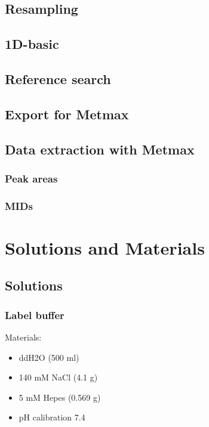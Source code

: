 \documentclass[]{book}
\providecommand{\tightlist}{%
  \setlength{\itemsep}{0pt}\setlength{\parskip}{0pt}}
\theoremstyle{definition}
\theoremstyle{definition}
\theoremstyle{definition}
\theoremstyle{remark}
\begin{document}
\section{Resampling}\label{resampling-1}

\section{1D-basic}\label{d-basic}

\section{Reference search}\label{reference-search}

\section{Export for Metmax}\label{export-for-metmax}

\section{Data extraction with Metmax}\label{data-extraction-with-metmax}

\subsection{Peak areas}\label{peak-areas}

\subsection{MIDs}\label{mids}

\chapter{Solutions and Materials}\label{mm}

\section{Solutions}\label{solutions}

\hypertarget{washingbuffer}{\subsection{Label
buffer}\label{washingbuffer}}

Materials:

\begin{itemize}
\tightlist
\item
  ddH2O (500 ml)
\item
  140 mM NaCl (4.1 g)
\item
  5 mM Hepes (0.569 g)
\item
  pH calibration 7.4
\end{itemize}
\end{document}
